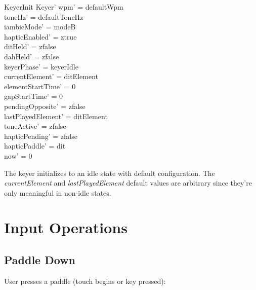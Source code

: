 \documentclass[a4paper,10pt,fleqn]{article}
\begin{document}
\begin{schema}{KeyerInit}
Keyer'
\where
wpm' = defaultWpm \\
toneHz' = defaultToneHz \\
iambicMode' = modeB \\
hapticEnabled' = ztrue \\
ditHeld' = zfalse \\
dahHeld' = zfalse \\
keyerPhase' = keyerIdle \\
currentElement' = ditElement \\
elementStartTime' = 0 \\
gapStartTime' = 0 \\
pendingOpposite' = zfalse \\
lastPlayedElement' = ditElement \\
toneActive' = zfalse \\
hapticPending' = zfalse \\
hapticPaddle' = dit \\
now' = 0
\end{schema}

The keyer initializes to an idle state with default configuration. The
\emph{currentElement} and \emph{lastPlayedElement} default values are
arbitrary since they're only meaningful in non-idle states.

\section{Input Operations}

\subsection{Paddle Down}

User presses a paddle (touch begins or key pressed):
\end{document}
